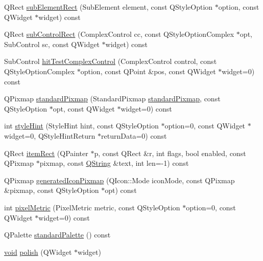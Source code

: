 \begin{DoxyCompactItemize}
\-Q\-Rect \hyperlink{group___core_plugin_ga5263b6ad64fb081f45d6a1c9553492dd}{sub\-Element\-Rect} (\-Sub\-Element element, const \-Q\-Style\-Option $\ast$option, const \-Q\-Widget $\ast$widget) const 
\item 
\-Q\-Rect \hyperlink{group___core_plugin_ga50a13d81cf4a2ccf6f94f68ce6f9f069}{sub\-Control\-Rect} (\-Complex\-Control cc, const \-Q\-Style\-Option\-Complex $\ast$opt, \-Sub\-Control sc, const \-Q\-Widget $\ast$widget) const 
\item 
\-Sub\-Control \hyperlink{group___core_plugin_ga1dce79a28fc44a61d53baca24aaa4754}{hit\-Test\-Complex\-Control} (\-Complex\-Control control, const \-Q\-Style\-Option\-Complex $\ast$option, const \-Q\-Point \&pos, const \-Q\-Widget $\ast$widget=0) const 
\item 
\-Q\-Pixmap \hyperlink{group___core_plugin_ga175a432cafb816b4ac5f32966bc8acd3}{standard\-Pixmap} (\-Standard\-Pixmap \hyperlink{group___core_plugin_ga175a432cafb816b4ac5f32966bc8acd3}{standard\-Pixmap}, const \-Q\-Style\-Option $\ast$opt, const \-Q\-Widget $\ast$widget=0) const 
\item 
int \hyperlink{group___core_plugin_ga52818c2da80eda9a0961a672d7d0f9d7}{style\-Hint} (\-Style\-Hint hint, const \-Q\-Style\-Option $\ast$option=0, const \-Q\-Widget $\ast$widget=0, \-Q\-Style\-Hint\-Return $\ast$return\-Data=0) const 
\item 
\-Q\-Rect \hyperlink{group___core_plugin_gaf4019d968fe156c4b16f8b3216544a0e}{item\-Rect} (\-Q\-Painter $\ast$p, const \-Q\-Rect \&r, int flags, bool enabled, const \-Q\-Pixmap $\ast$pixmap, const \hyperlink{group___u_a_v_objects_plugin_gab9d252f49c333c94a72f97ce3105a32d}{\-Q\-String} \&text, int len=-\/1) const 
\item 
\-Q\-Pixmap \hyperlink{group___core_plugin_gafda287aff563c7ed26a8301096c93fe2}{generated\-Icon\-Pixmap} (\-Q\-Icon\-::\-Mode icon\-Mode, const \-Q\-Pixmap \&pixmap, const \-Q\-Style\-Option $\ast$opt) const 
\item 
int \hyperlink{group___core_plugin_gab82e6e47c29f4a4dc06d1fc447c7f9f0}{pixel\-Metric} (\-Pixel\-Metric metric, const \-Q\-Style\-Option $\ast$option=0, const \-Q\-Widget $\ast$widget=0) const 
\item 
\-Q\-Palette \hyperlink{group___core_plugin_ga9045a941a0161ceafde31250e553909c}{standard\-Palette} () const 
\item 
\hyperlink{group___u_a_v_objects_plugin_ga444cf2ff3f0ecbe028adce838d373f5c}{void} \hyperlink{group___core_plugin_ga69c435e6556d68ccfbdbd2226c913510}{polish} (\-Q\-Widget $\ast$widget)

\end{DoxyCompactItemize}
